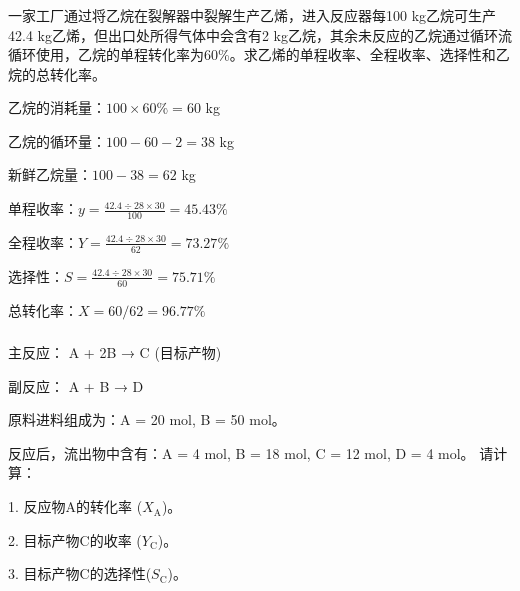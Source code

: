       


\begin{frame}[t]
    \frametitle{}
    \begin{question}
      一家工厂通过将乙烷在裂解器中裂解生产乙烯，进入反应器每100 kg乙烷可生产42.4 kg乙烯，但出口处所得气体中会含有2 kg乙烷，其余未反应的乙烷通过循环流循环使用，乙烷的单程转化率为60\%。求乙烯的单程收率、全程收率、选择性和乙烷的总转化率。
    \end{question}\pause
    乙烷的消耗量：$100 \times 60\% = 60$ kg

    乙烷的循环量：$100 - 60 - 2 = 38 $ kg

    新鲜乙烷量：$100-38=62$ kg

    单程收率：$y=\frac{42.4\div 28 \times 30}{100} = 45.43\%$

    全程收率：$Y=\frac{42.4\div 28 \times 30}{62} = 73.27\%$

    选择性：$S=\frac{42.4\div 28 \times 30}{60} = 75.71\%$

    总转化率：$X = 60/62 = 96.77\%$
\end{frame}


\begin{frame}[t]
    \frametitle{}
    \begin{question}
        主反应： A + 2B → C (目标产物)

副反应： A + B → D

原料进料组成为：A = 20 mol, B = 50 mol。

反应后，流出物中含有：A = 4 mol, B = 18 mol, C = 12 mol, D = 4 mol。
        \tcblower
        请计算：

    1. 反应物A的转化率 ($X_\mathrm{A}$)。

    2. 目标产物C的收率 ($Y_\mathrm{C}$)。

    3. 目标产物C的选择性($S_\mathrm{C}$)。
    \end{question}
\end{frame}


